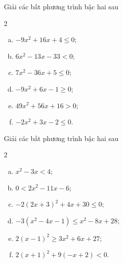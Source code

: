 \begin{bt}%
	Giải các bất phương trình bậc hai sau
	\begin{multicols}{2}
		\begin{enumerate}[a)]
			\item $-9x^2+16x+4 \leq 0$;
			\item $6x^2-13x-33<0$;
			\item $7x^2-36x+5 \leq 0$;
			\item $-9x^2+6x-1 \geq 0$;
			\item $49x^2+56x+16>0$;
			\item $-2x^2+3x-2 \leq 0$.	
		\end{enumerate}
	\end{multicols}
\end{bt}

\begin{bt}%
	Giải các bất phương trình bậc hai sau
	\begin{multicols}{2}
		\begin{enumerate}[a)]
			\item $x^2-3x<4$;
			\item $0<2x^2-11x-6$;
			\item $-2(2x+3)^2+4x+30 \leq 0$;
			\item $-3(x^2-4x-1) \leq x^2-8x+28$;
			\item $2(x-1)^2 \geq 3x^2+6x+27$;
			\item $2(x+1)^2+9(-x+2)<0$.
		\end{enumerate}
	\end{multicols}
\end{bt}

